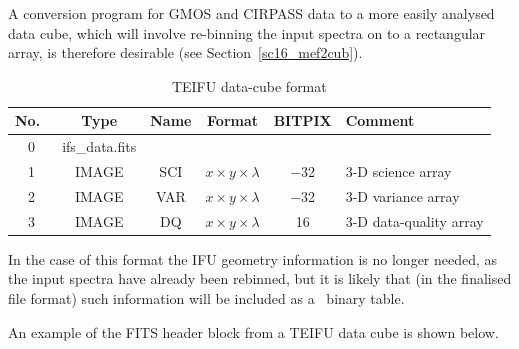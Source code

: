 \documentclass[twoside,11pt]{article}
\newcommand{\htmlref}[2]{#1}
\newcommand{\latex}[1]{#1}
\begin{document}
A \htmlref{conversion program}{sc16_mef2cub} for GMOS and CIRPASS data
to a more easily analysed data cube, which will involve re-binning the
input spectra on to a rectangular array, is therefore
desirable\latex{ (see Section~\ref{sc16_mef2cub})}.

\begin{table}[h]
\begin{center}
\begin{tabular}{cccccl}
No.\ & Type  & Name & Format & BITPIX & Comment\\\hline 
0 &ifs\_data.fits &  &          &       & \\
1 & IMAGE & SCI & $x \times y\times \lambda$ & $-$32 & 3-D science array \\
2 & IMAGE & VAR & $x \times y\times \lambda$ & $-$32 & 3-D variance array \\
3 & IMAGE & DQ  & $x \times y\times \lambda$ &    16 & 3-D data-quality array \\ \hline
\end{tabular}
\caption{TEIFU data-cube format}
\end{center}
\protect\label{tab:cub_file}
\end{table} 

In the case of this format the IFU geometry information is no longer
needed, as the input spectra have already been rebinned, but it is
likely that (in the finalised file format) such information will be
included as a \FITSref\  binary table.

An example of the FITS header block from a TEIFU data cube is shown below.
\end{document}
